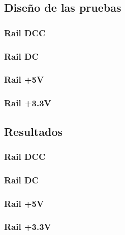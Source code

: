

\subsection{Diseño de las pruebas}



\subsubsection{Rail DCC}


\subsubsection{Rail DC}



\subsubsection{Rail +5V}


\subsubsection{Rail +3.3V}


\subsection{Resultados}

\subsubsection{Rail DCC}


\subsubsection{Rail DC}



\subsubsection{Rail +5V}


\subsubsection{Rail +3.3V}
